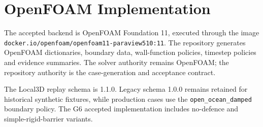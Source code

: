 \section{OpenFOAM Implementation}

The accepted backend is OpenFOAM Foundation 11, executed through the image \texttt{docker.io/openfoam/openfoam11-paraview510:11}. The repository generates OpenFOAM dictionaries, boundary data, wall-function policies, timestep policies and evidence summaries. The solver authority remains OpenFOAM; the repository authority is the case-generation and acceptance contract.

The Local3D replay schema is 1.1.0. Legacy schema 1.0.0 remains retained for historical synthetic fixtures, while production cases use the \texttt{open\_ocean\_damped} boundary policy. The G6 accepted implementation includes no-defence and simple-rigid-barrier variants.
